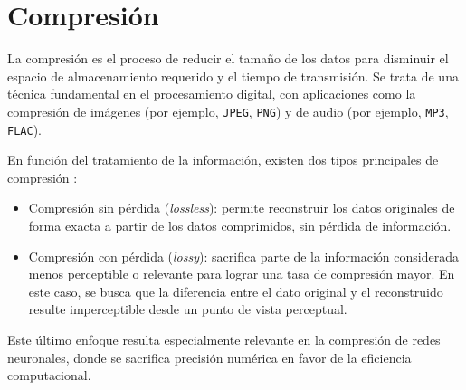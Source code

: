 \section{Compresión}
\label{sec:compresion}

La compresión es el proceso de reducir el tamaño de los datos para disminuir el espacio de almacenamiento requerido y el tiempo de transmisión. Se trata de una técnica fundamental en el procesamiento digital, con aplicaciones como la compresión de imágenes (por ejemplo, \texttt{JPEG}, \texttt{PNG}) y de audio (por ejemplo, \texttt{MP3}, \texttt{FLAC}).

En función del tratamiento de la información, existen dos tipos principales de compresión \cite{Kavitha2016A}:

\begin{itemize}
    \item Compresión sin pérdida (\textit{lossless}): permite reconstruir los datos originales de forma exacta a partir de los datos comprimidos, sin pérdida de información.
    \item Compresión con pérdida (\textit{lossy}): sacrifica parte de la información considerada menos perceptible o relevante para lograr una tasa de compresión mayor. En este caso, se busca que la diferencia entre el dato original y el reconstruido resulte imperceptible desde un punto de vista perceptual.
\end{itemize}

Este último enfoque resulta especialmente relevante en la compresión de redes neuronales, donde se sacrifica precisión numérica en favor de la eficiencia computacional.
